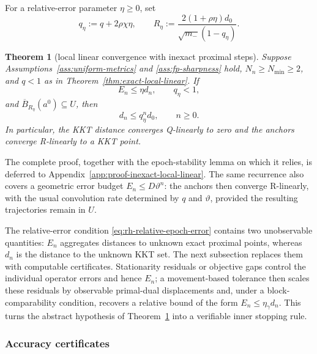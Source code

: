 \documentclass[letterpaper]{article} %
\newtheorem{theorem}{Theorem}[section] %
\theoremstyle{definition}
\theoremstyle{remark}
\begin{document}
For a relative-error parameter $\eta\ge0$, set
\[
    q_\eta
    :=
    q+2\rho\chi\eta,
    \qquad
    R_\eta
    :=
    \frac{2(1+\rho\eta)d_0}
         {\sqrt{m_-}(1-q_\eta)}.
\]

\begin{theorem}[local linear convergence with inexact proximal steps]
\label{thm:inexact-local-linear}
Suppose Assumptions~\ref{ass:uniform-metrics} and
\ref{ass:fp-sharpness} hold, $N_n\ge N_{\min}\ge2$, and $q<1$ as in
Theorem~\ref{thm:exact-local-linear}.  If
\begin{equation}
\label{eq:rh-relative-epoch-error}
    E_n\le\eta d_n,
    \qquad
    q_\eta<1,
\end{equation}
and $\overline B_{R_\eta}(a^0)\subseteq U$, then
\begin{equation}
\label{eq:inexact-relative-rate}
    d_n\le q_\eta^nd_0,
    \qquad n\ge0.
\end{equation}
In particular, the KKT distance converges Q-linearly to zero and the anchors
converge R-linearly to a KKT point.
\end{theorem}

The complete proof, together with the epoch-stability lemma on which it
relies, is deferred to Appendix~\ref{app:proof-inexact-local-linear}.  The same
recurrence also covers a geometric error budget $E_n\le D\vartheta^n$: the
anchors then converge R-linearly, with the usual convolution rate determined
by $q$ and $\vartheta$, provided the resulting trajectories remain in $U$.

The relative-error condition \eqref{eq:rh-relative-epoch-error} contains two
unobservable quantities: $E_n$ aggregates distances to unknown exact
proximal points, whereas $d_n$ is the distance to the unknown KKT set.  The
next subsection replaces them with computable certificates.  Stationarity
residuals or objective gaps control the individual operator errors and hence
$E_n$; a movement-based tolerance then scales these residuals by observable
primal-dual displacements and, under a block-comparability condition,
recovers a relative bound of the form $E_n\le\eta_\gamma d_n$.  This turns the
abstract hypothesis of Theorem~\ref{thm:inexact-local-linear} into a
verifiable inner stopping rule.

\subsubsection{Accuracy certificates}
\end{document}
